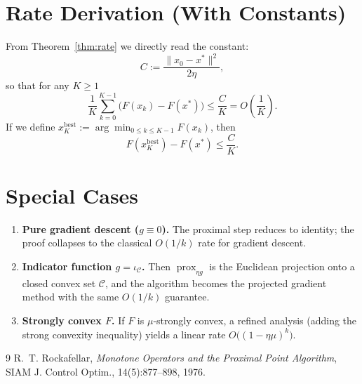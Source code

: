 \documentclass{article}
\newcommand{\prox}{\operatorname{prox}}
\begin{document}
\section*{Rate Derivation (With Constants)}
From Theorem~\ref{thm:rate} we directly read the constant:
\[
C:=\frac{\|x_{0}-x^{*}\|^{2}}{2\eta},
\]
so that for any $K\ge1$
\[
\frac{1}{K}\sum_{k=0}^{K-1}\bigl(F(x_{k})-F(x^{*})\bigr)\le \frac{C}{K}=O\!\left(\frac{1}{K}\right).
\]
If we define $x_{K}^{\text{best}}:=\arg\min_{0\le k\le K-1}F(x_{k})$, then
\[
F(x_{K}^{\text{best}})-F(x^{*})\le \frac{C}{K}.
\]

\section*{Special Cases}
\begin{enumerate}[label=(\alph*)]
    \item \textbf{Pure gradient descent ($g\equiv0$).} The proximal step reduces to identity; the proof collapses to the classical $O(1/k)$ rate for gradient descent.
    \item \textbf{Indicator function $g=\iota_{\mathcal{C}}$.} Then $\prox_{\eta g}$ is the Euclidean projection onto a closed convex set $\mathcal{C}$, and the algorithm becomes the projected gradient method with the same $O(1/k)$ guarantee.
    \item \textbf{Strongly convex $F$.} If $F$ is $\mu$‑strongly convex, a refined analysis (adding the strong convexity inequality) yields a linear rate $O\big((1-\eta\mu)^{k}\big)$.
\end{enumerate}

\begin{thebibliography}{9}
R.~T. Rockafellar, \emph{Monotone Operators and the Proximal Point Algorithm}, SIAM J. Control Optim., 14(5):877–898, 1976.
\end{thebibliography}
\end{document}
